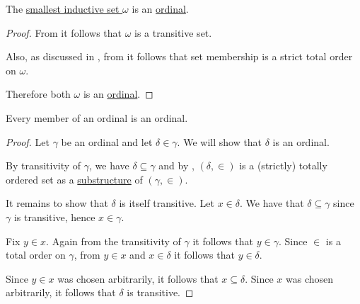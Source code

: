 \begin{proposition}\label{thm:omega_is_an_ordinal}
  The \hyperref[thm:smallest_inductive_set_existence_existence]{smallest inductive set \( \omega \)} is an \hyperref[def:ordinal]{ordinal}.
\end{proposition}
\begin{proof}
  From  it follows that \( \omega \) is a transitive set.

  Also, as discussed in , from  it follows that set membership is a strict total order on \( \omega \).

  Therefore both \( \omega \) is an \hyperref[def:ordinal]{ordinal}.
\end{proof}

\begin{proposition}\label{thm:member_of_ordinal_is_ordinal}
  Every member of an ordinal is an ordinal.
\end{proposition}
\begin{proof}
  Let \( \gamma \) be an ordinal and let \( \delta \in \gamma \). We will show that \( \delta \) is an ordinal.

  By transitivity of \( \gamma \), we have \( \delta \subseteq \gamma \) and by , \( (\delta, \in) \) is a (strictly) totally ordered set as a \hyperref[def:first_order_substructure]{substructure} of \( (\gamma, \in) \).

  It remains to show that \( \delta \) is itself transitive. Let \( x \in \delta \). We have that \( \delta \subseteq \gamma \) since \( \gamma \) is transitive, hence \( x \in \gamma \).

  Fix \( y \in x \). Again from the transitivity of \( \gamma \) it follows that \( y \in \gamma \). Since \( \in \) is a total order on \( \gamma \), from \( y \in x \) and \( x \in \delta \) it follows that \( y \in \delta \).

  Since \( y \in x \) was chosen arbitrarily, it follows that \( x \subseteq \delta \). Since \( x \) was chosen arbitrarily, it follows that \( \delta \) is transitive.
\end{proof}

